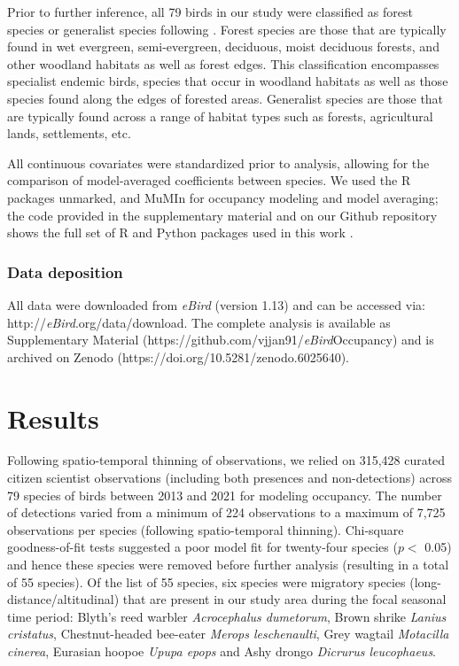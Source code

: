 Prior to further inference, all 79 birds in our study were classified as forest species or generalist species following \citep{ali1983}.
Forest species are those that are typically found in wet evergreen, semi-evergreen, deciduous, moist deciduous forests, and other woodland habitats as well as forest edges.
This classification encompasses specialist endemic birds, species that occur in woodland habitats as well as those species found along the edges of forested areas.
Generalist species are those that are typically found across a range of habitat types such as forests, agricultural lands, settlements, etc.

All continuous covariates were standardized prior to analysis, allowing for the comparison of model-averaged coefficients between species.
We used the R packages unmarked, and MuMIn for occupancy modeling and model averaging; the code provided in the supplementary material and on our Github repository shows the full set of R and Python packages used in this work \citep{barton2009,fiske2011,r2020}.

\subsubsection*{Data deposition}

All data were downloaded from \textit{eBird} (version 1.13) and can be accessed via: http://\textit{eBird}.org/data/download.
The complete analysis is available as Supplementary Material (https://github.com/vjjan91/\textit{eBird}Occupancy) and is archived on Zenodo (https://doi.org/10.5281/zenodo.6025640).

\section*{Results}

Following spatio-temporal thinning of observations, we relied on 315,428 curated citizen scientist observations (including both presences and non-detections) across 79 species of birds between 2013 and 2021 for modeling occupancy.
The number of detections varied from a minimum of 224 observations to a maximum of 7,725 observations per species (following spatio-temporal thinning).
Chi-square goodness-of-fit tests suggested a poor model fit for twenty-four species ($p <$ 0.05) and hence these species were removed before further analysis (resulting in a total of 55 species).
Of the list of 55 species, six species were migratory species (long-distance/altitudinal) that are present in our study area during the focal seasonal time period: Blyth's reed warbler \textit{Acrocephalus dumetorum}, Brown shrike \textit{Lanius cristatus}, Chestnut-headed bee-eater \textit{Merops leschenaulti}, Grey wagtail \textit{Motacilla cinerea}, Eurasian hoopoe \textit{Upupa epops} and Ashy drongo \textit{Dicrurus leucophaeus}.

